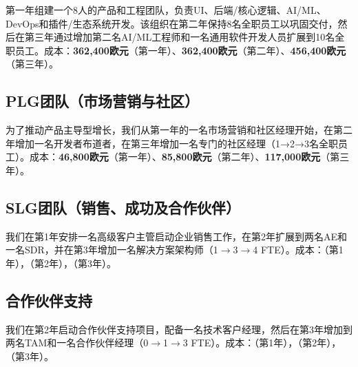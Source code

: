 \documentclass[11pt, a4paper, oneside]{article}
\begin{document}
第一年组建一个8人的产品和工程团队，负责UI、后端/核心逻辑、AI/ML、DevOps和插件/生态系统开发。该组织在第二年保持8名全职员工以巩固交付，然后在第三年通过增加第二名AI/ML工程师和一名通用软件开发人员扩展到10名全职员工。成本：\textbf{362,400欧元}（第一年）、\textbf{362,400欧元}（第二年）、\textbf{456,400欧元}（第三年）。

\subsection{PLG团队（市场营销与社区）}

为了推动产品主导型增长，我们从第一年的一名市场营销和社区经理开始，在第二年增加一名开发者布道者，在第三年增加一名专门的社区经理（1→2→3名全职员工）。成本：\textbf{46,800欧元}（第一年）、\textbf{85,800欧元}（第二年）、\textbf{117,000欧元}（第三年）。



\subsection{SLG团队（销售、成功及合作伙伴）}
我们在第1年安排一名高级客户主管启动企业销售工作，在第2年扩展到两名AE和一名SDR，并在第3年增加一名解决方案架构师（1$\rightarrow$3$\rightarrow$4 FTE）。成本：\textbf{}（第1年），\textbf{}（第2年），\textbf{}（第3年）。

\subsection{合作伙伴支持}
我们在第2年启动合作伙伴支持项目，配备一名技术客户经理，然后在第3年增加到两名TAM和一名合作伙伴经理（0$\rightarrow$1$\rightarrow$3 FTE）。成本：\textbf{}（第1年），\textbf{}（第2年），\textbf{}（第3年）。
\end{document}
